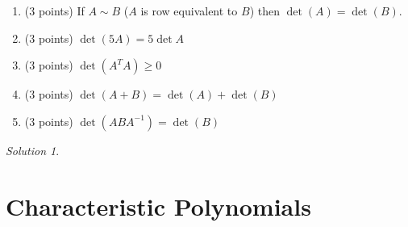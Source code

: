 \documentclass{article}
\theoremstyle{remark}
\newtheorem*{solution}{Solution}
\begin{document}
\begin{enumerate}
\item (3 points) If $A \sim B$ ($A$ is row equivalent to $B$) then $\det(A) = \det(B)$.
\item (3 points) $\det(5A) = 5\det A$
\item (3 points) $\det(A^TA) \geq 0$
\item (3 points) $\det(A + B) = \det(A) + \det(B)$
\item (3 points) $\det(ABA^{-1}) = \det(B)$
\end{enumerate}

\medskip

\begin{solution}
\end{solution}

\pagebreak
\section{Characteristic Polynomials}
\end{document}
